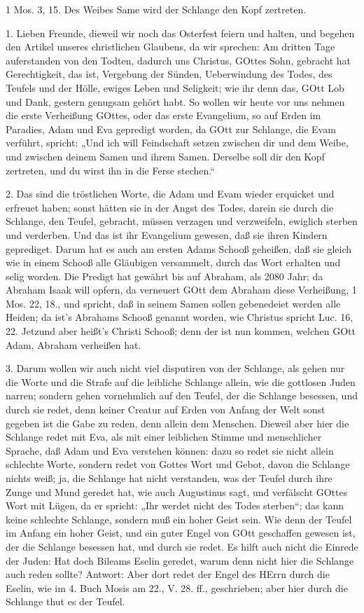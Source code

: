 1 Mos. 3, 15. Des Weibes Same wird der Schlange den Kopf zertreten.

1. Lieben Freunde, dieweil wir noch das Osterfest feiern und halten, und begehen den Artikel unseres christlichen Glaubens, da wir sprechen: Am dritten Tage auferstanden von den Todten, dadurch uns Christus, GOttes Sohn, gebracht hat Gerechtigkeit, das ist, Vergebung der Sünden, Ueberwindung des Todes, des Teufels und der Hölle, ewiges Leben und Seligkeit; wie ihr denn das, GOtt Lob und Dank, gestern genugsam gehört habt. So wollen wir heute vor uns nehmen die erste Verheißung GOttes, oder das erste Evangelium, so auf Erden im Paradies, Adam und Eva gepredigt worden, da GOtt zur Schlange, die Evam verführt, spricht: „Und ich will Feindschaft setzen zwischen dir und dem Weibe, und zwischen deinem Samen und ihrem Samen. Derselbe soll dir den Kopf zertreten, und du wirst ihn in die Ferse stechen.“

2. Das sind die tröstlichen Worte, die Adam und Evam wieder erquicket und erfreuet haben; sonst hätten sie in der Angst des Todes, darein sie durch die Schlange, den Teufel, gebracht, müssen verzagen und verzweifeln, ewiglich sterben und verderben. Und das ist ihr Evangelium gewesen, daß sie ihren Kindern geprediget. Darum hat es auch am ersten Adams Schooß geheißen, daß sie gleich wie in einem Schooß alle Gläubigen versammelt, durch das Wort erhalten und selig worden. Die Predigt hat gewährt bis auf Abraham, als 2080 Jahr; da Abraham Isaak will opfern, da verneuert GOtt dem Abraham diese Verheißung, 1 Mos. 22, 18., und spricht, daß in seinem Samen sollen gebenedeiet werden alle Heiden; da ist's Abrahams Schooß genannt worden, wie Christus spricht Luc. 16, 22. Jetzund aber heißt’s Christi Schooß; denn der ist nun kommen, welchen GOtt Adam, Abraham verheißen hat.

3. Darum wollen wir auch nicht viel disputiren von der Schlange, als gehen nur die Worte und die Strafe auf die leibliche Schlange allein, wie die gottlosen Juden narren; sondern gehen vornehmlich auf den Teufel, der die Schlange besessen, und durch sie redet, denn keiner Creatur auf Erden von Anfang der Welt sonst gegeben ist die Gabe zu reden, denn allein dem Menschen. Dieweil aber hier die Schlange redet mit Eva, als mit einer leiblichen Stimme und menschlicher Sprache, daß Adam und Eva verstehen können: dazu so redet sie nicht allein schlechte Worte, sondern redet von Gottes Wort
und Gebot, davon die Schlange nichts weiß; ja, die Schlange hat nicht verstanden, was der Teufel durch ihre Zunge und Mund geredet hat, wie auch Augustinus sagt, und verfälscht GOttes Wort mit Lügen, da er spricht: „Ihr werdet nicht des Todes sterben“; das kann keine schlechte Schlange, sondern muß ein hoher Geist sein. Wie denn der Teufel im Anfang ein hoher Geist, und ein guter Engel von GOtt geschaffen gewesen ist, der die Schlange besessen hat, und durch sie redet. Es hilft auch nicht die Einrede der Juden: Hat doch Bileams Eselin geredet, warum denn nicht hier die Schlange auch reden sollte? Antwort: Aber dort redet der Engel des HErrn durch die Eselin, wie im 4. Buch Mosis am 22., V. 28. ff., geschrieben; aber hier durch die Schlange thut es der Teufel.

